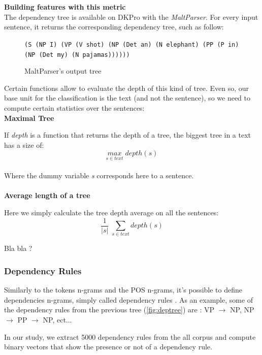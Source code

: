 \
\\
\\
\textbf{Building features with this metric}
\\
The dependency tree is available on DKPro with the \emph{MaltParser}\cite{Nivre_aquick}. For every input sentence, it returns the corresponding dependency tree, such as follow: 
\begin{figure}[h]
\begin{center}
\texttt{(S (NP I) (VP (V shot) (NP (Det an) (N elephant) (PP (P in) (NP (Det my) (N pajamas))))))}
\caption{\label{dkprotree} MaltParser's output tree}
\end{center}
\end{figure}
Certain functions allow to evaluate the depth of this kind of tree. Even so, our base unit for the classification is the text (and not the sentence), so we need to compute certain statistics over the sentences:
\\
\textbf{Maximal Tree}

If \emph{depth} is a function that returns the depth of a tree, the biggest tree in a text has a size of:
\begin{equation*}
\underset{s \in text}{max} \; depth(s)
\end{equation*}
\\
Where the dummy variable \emph{s} corresponds here to a sentence.
\\
\\
\textbf{Average length of a tree}

Here we simply calculate the tree depth average on all the sentences:
\begin{equation*}
\frac{1}{|s|} \; \displaystyle\sum_{s \in text} depth(s)
\end{equation*}

Bla bla ?

\subsubsection{Dependency Rules}
Similarly to the tokens n-grams and the POS n-grams, it's possible to define dependencies n-grams, simply called dependency rules \cite{TUD-CS-2014-0882}. As an example, some of the dependency rules from the previous tree (\cref{fig:deptree}) are : VP $\rightarrow$ NP, NP $\rightarrow$ PP $\rightarrow$ NP, ect...

In our study, we extract 5000 dependency rules from the all corpus and compute binary vectors that show the presence or not of a dependency rule.

